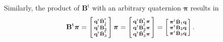 \documentclass[aip,jcp,reprint,amsmath,amssymb]{revtex4-1}
\makeatletter
\newcommand{\mt}[1]{\boldsymbol{\mathbf{#1}}}           %
\newcommand{\vt}[1]{\boldsymbol{\mathbf{#1}}}           %
\newcommand{\tr}[1]{#1^\text{t}}                               %
\newenvironment{smallarray}[1]
{\null\,\vcenter\bgroup\scriptsize
	\renewcommand{\arraystretch}{0.7}
	\arraycolsep=.13885em
	\hbox\bgroup$\array{@{}#1@{}}}
{\endarray$\egroup\egroup\,\null}
\makeatother
\begin{document}
Similarly, the product of $\tr{\mt B}$ with an arbitrary quaternion $\vt \pi$ results in
\begin{equation}
\label{eq:vector_entries}
\tr{\mt B}\vt \pi =
\left[\begin{smallarray}{c}
\tr{\vt q}\tr{\hat{\mt B}}_1 \\
\tr{\vt q}\tr{\hat{\mt B}}_2 \\
\tr{\vt q}\tr{\hat{\mt B}}_3 \\
\end{smallarray}\right]\vt \pi = 
\left[\begin{smallarray}{c}
\tr{\vt q}\tr{\hat{\mt B}}_1\vt \pi \\
\tr{\vt q}\tr{\hat{\mt B}}_2\vt \pi \\
\tr{\vt q}\tr{\hat{\mt B}}_3\vt \pi \\
\end{smallarray}\right] = 
\left[\begin{smallarray}{c}
\tr{\vt \pi}{\hat{\mt B}}_1\vt q \\
\tr{\vt \pi}{\hat{\mt B}}_2\vt q \\
\tr{\vt \pi}{\hat{\mt B}}_3\vt q \\
\end{smallarray}\right].
\end{equation}
\end{document}
